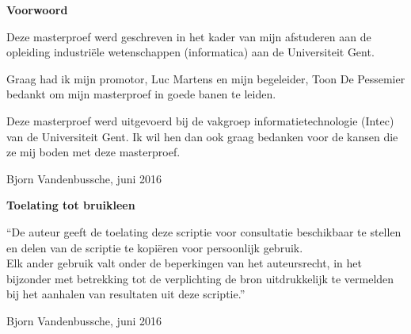 
\newpage

\noindent \textbf{\huge Voorwoord}

\vspace{1.5cm}

\noindent
Deze masterproef werd geschreven in het kader van mijn afstuderen aan de opleiding industri\"ele wetenschappen (informatica) aan de Universiteit Gent. 

\noindent
Graag had ik mijn promotor, Luc Martens en mijn begeleider, Toon De Pessemier bedankt om mijn masterproef in goede banen te leiden. 

\noindent
Deze masterproef werd uitgevoerd bij de vakgroep informatietechnologie (Intec) van de Universiteit Gent. Ik wil hen dan ook graag bedanken voor de kansen die ze mij boden met deze masterproef. 


\addvspace{4cm}

\noindent Bjorn Vandenbussche, juni 2016\newpage

\noindent \textbf{\huge Toelating tot bruikleen}

\vspace{1.5cm}

\noindent
``De auteur geeft de toelating deze scriptie voor consultatie beschikbaar
te stellen en delen van de scriptie te kopi\"eren voor persoonlijk
gebruik.\\
Elk ander gebruik valt onder de beperkingen van het auteursrecht,
in het bijzonder met betrekking tot de verplichting de bron uitdrukkelijk
te vermelden bij het aanhalen van resultaten uit deze scriptie.''

\addvspace{4cm}

\noindent Bjorn Vandenbussche, juni 2016
